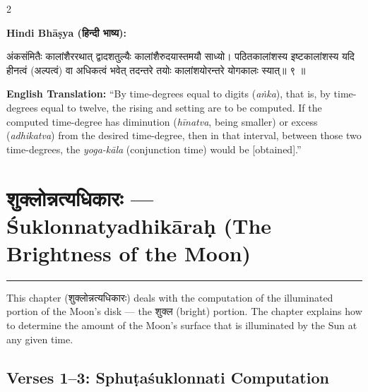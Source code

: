 \documentclass[11pt,a4paper]{article}
\newcommand{\dev}[1]{{\devanagarifont #1}}
\newenvironment{sanskritverse}{%
  \begin{center}\begin{minipage}{0.95\textwidth}
  \setlength{\leftskip}{1em}
  \setlength{\rightskip}{1em}
  \dev
}{\end{minipage}\end{center}}
\begin{document}
\vspace{0.5em}

\begin{paracol}{2}

\noindent\textbf{Hindi Bhāṣya (\dev{हिन्दी भाष्य}):}
\begin{sanskritverse}
अंकसंमितैः कालांशैररथात् द्वादशतुल्यैः कालांशैरुदयास्तमयौ साध्यो। पठितकालांशस्य
इष्टकालांशस्य यदि हीनत्वं (अल्पत्वं) वा अधिकत्वं भवेत् तदन्तरे तयोः कालांशयोरन्तरे
योगकालः स्यात्॥ ९ ॥
\end{sanskritverse}

\switchcolumn

\textbf{English Translation:} ``By time-degrees equal to digits (\textit{aṅka}), that is, by time-degrees equal to twelve, the rising and setting are to be computed. If the computed time-degree has diminution (\textit{hīnatva}, being smaller) or excess (\textit{adhikatva}) from the desired time-degree, then in that interval, between those two time-degrees, the \textit{yoga-kāla} (conjunction time) would be [obtained].''

\end{paracol}

\newpage


\section{\texorpdfstring{{\devanagarifont शुक्लोन्नत्यधिकारः} — Śuklonnatyadhikāraḥ (The Brightness of the Moon)}{Śuklonnatyadhikāraḥ (The Brightness of the Moon)}}
\label{sec:shuklonnati}

\begin{center}
\textcolor{rulecolor}{\rule{0.8\textwidth}{0.5pt}}
\end{center}

This chapter (\dev{शुक्लोन्नत्यधिकारः}) deals with the computation of the illuminated portion of the Moon's disk --- the \dev{शुक्ल} (bright) portion. The chapter explains how to determine the amount of the Moon's surface that is illuminated by the Sun at any given time.

\subsection{Verses 1--3: Sphuṭaśuklonnati Computation}
\end{document}
